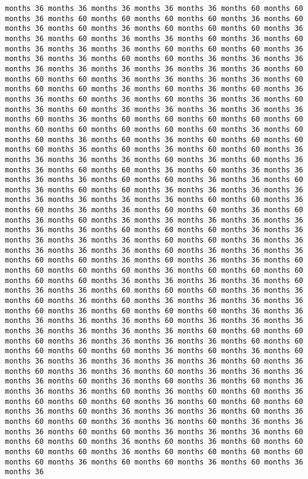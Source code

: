\documentclass[11pt]{article}
\begin{document}
\begin{Verbatim}[commandchars=\\\{\}, frame=single, framerule=2mm, rulecolor=\color{outerrorbackground}]
months 36 months 36 months 36 months 36 months 36 months 60 months 60 months 36 months 60 months 60 months 60 months 60 months 36 months 60 months 36 months 60 months 36 months 60 months 60 months 60 months 36 months 36 months 60 months 36 months 36 months 60 months 36 months 60 months 36 months 36 months 36 months 60 months 60 months 60 months 36 months 36 months 36 months 60 months 60 months 36 months 36 months 36 months 36 months 36 months 36 months 36 months 36 months 36 months 60 months 60 months 60 months 36 months 36 months 36 months 36 months 60 months 60 months 60 months 36 months 60 months 36 months 60 months 36 months 36 months 60 months 36 months 60 months 36 months 36 months 60 months 36 months 60 months 36 months 36 months 36 months 36 months 36 months 60 months 36 months 60 months 60 months 60 months 60 months 60 months 60 months 60 months 60 months 60 months 60 months 36 months 60 months 60 months 36 months 60 months 36 months 60 months 60 months 60 months 60 months 36 months 60 months 36 months 60 months 60 months 36 months 36 months 36 months 36 months 60 months 36 months 60 months 36 months 36 months 60 months 60 months 36 months 60 months 36 months 36 months 36 months 36 months 60 months 60 months 36 months 36 months 60 months 36 months 60 months 60 months 36 months 36 months 36 months 36 months 36 months 36 months 36 months 36 months 60 months 60 months 36 months 60 months 36 months 36 months 60 months 60 months 36 months 60 months 36 months 60 months 36 months 36 months 36 months 36 months 36 months 36 months 36 months 60 months 60 months 60 months 36 months 36 months 36 months 36 months 36 months 60 months 60 months 36 months 36 months 36 months 36 months 36 months 60 months 36 months 36 months 36 months 60 months 60 months 36 months 60 months 36 months 36 months 60 months 60 months 60 months 60 months 36 months 60 months 60 months 60 months 60 months 60 months 36 months 36 months 36 months 36 months 60 months 36 months 36 months 60 months 60 months 60 months 36 months 36 months 60 months 36 months 60 months 36 months 36 months 36 months 36 months 60 months 36 months 60 months 60 months 60 months 36 months 36 months 36 months 36 months 36 months 60 months 36 months 36 months 36 months 36 months 36 months 36 months 36 months 60 months 60 months 60 months 60 months 36 months 36 months 36 months 36 months 60 months 60 months 60 months 60 months 60 months 36 months 60 months 36 months 60 months 36 months 36 months 36 months 36 months 36 months 60 months 36 months 60 months 36 months 36 months 60 months 36 months 36 months 36 months 36 months 60 months 36 months 60 months 36 months 60 months 36 months 36 months 36 months 60 months 36 months 60 months 60 months 36 months 60 months 60 months 60 months 36 months 60 months 60 months 60 months 36 months 60 months 36 months 36 months 36 months 60 months 36 months 60 months 60 months 36 months 36 months 60 months 36 months 36 months 36 months 60 months 60 months 36 months 36 months 36 months 60 months 60 months 60 months 36 months 60 months 36 months 60 months 60 months 60 months 60 months 36 months 60 months 60 months 60 months 60 months 60 months 36 months 60 months 60 months 36 months 60 months 36 months 36 
\end{Verbatim}
\end{document}
